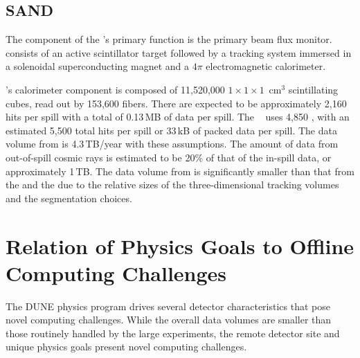 \documentclass[../main-v1.tex]{subfiles}
\begin{document}
\subsection{SAND }
\label{sec:comp-dataestimates-sand}

The  component of the 's primary function is the primary beam flux monitor.    consists of an active scintillator target  followed by a tracking system immersed in a solenoidal superconducting magnet  and  a $4\pi$ electromagnetic calorimeter.

's  calorimeter component is composed of 11,520,000 $1\times 1\times 1$~cm$^3$ scintillating cubes, read out by 153,600 fibers.  There are expected to be approximately 2,160 hits per spill with a total of 0.13\,MB of data per spill.  The  ~\cite{Adinolfi:2002zx} uses 4,850 , with an estimated 5,500 total hits per spill or 33\,kB of packed data per spill.   The data volume from  is 4.3\,TB/year with these assumptions.  The amount of data from out-of-spill cosmic rays is estimated to be 20\% of that of the in-spill data, or approximately 1\,TB.  The data volume from  is significantly smaller than that from the  and the  due to the relative sizes of the three-dimensional tracking volumes and the segmentation choices.





\section{Relation of Physics Goals to Offline Computing Challenges }

The DUNE physics program drives several detector characteristics that pose novel computing challenges.  While the overall data volumes are smaller than those routinely handled by the large  experiments, the remote detector site and unique physics goals present novel computing challenges. 
\end{document}
